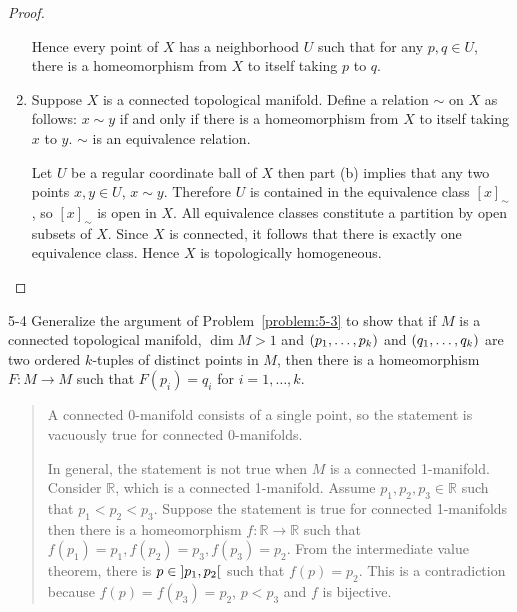 \begin{proof}
\begin{enumerate}[label={(\alph*)}]
		      Hence every point of \( X \) has a neighborhood \( U \) such that for any \( p, q \in U \), there is a homeomorphism from \( X \) to itself taking \( p \) to \( q \).
		\item Suppose \( X \) is a connected topological manifold. Define a relation \( \sim \) on \( X \) as follows: \( x \sim y \) if and only if there is a homeomorphism from \( X \) to itself taking \( x \) to \( y \). \( \sim \) is an equivalence relation.

		      Let \( U \) be a regular coordinate ball of \( X \) then part (b) implies that any two points \( x, y\in U \), \( x \sim y \). Therefore \( U \) is contained in the equivalence class \( {[x]}_{\sim} \), so \( {[x]}_{\sim} \) is open in \( X \). All equivalence classes constitute a partition by open subsets of \( X \). Since \( X \) is connected, it follows that there is exactly one equivalence class. Hence \( X \) is topologically homogeneous.
	\end{enumerate}
\end{proof}

\begin{problem}{5-4}\label{problem:5-4}
Generalize the argument of Problem~\ref{problem:5-3} to show that if \( M \) is a connected topological manifold, \( \dim M > 1 \) and \( \left({p_{1}, \ldots, p_{k}}\right) \) and \( \left({q_{1}, \ldots, q_{k}}\right) \) are two ordered \( k \)-tuples of distinct points in \( M \), then there is a homeomorphism \( F: M \to M \) such that \( F(p_{i}) = q_{i} \) for \( i = 1, \ldots, k \).
\end{problem}

\begin{quote}
	A connected 0-manifold consists of a single point, so the statement is vacuously true for connected 0-manifolds.

	In general, the statement is not true when \( M \) is a connected 1-manifold. Consider \( \mathbb{R} \), which is a connected 1-manifold. Assume \( p_{1}, p_{2}, p_{3}\in \mathbb{R} \) such that \( p_{1} < p_{2} < p_{3} \). Suppose the statement is true for connected 1-manifolds then there is a homeomorphism \( f: \mathbb{R} \to \mathbb{R} \) such that \( f(p_{1}) = p_{1}, f(p_{2}) = p_{3}, f(p_{3}) = p_{2} \). From the intermediate value theorem, there is \( p \in \left]{p_{1}, p_{2}}\right[ \) such that \( f(p) = p_{2} \). This is a contradiction because \( f(p) = f(p_{3}) = p_{2} \), \( p < p_{3} \) and \( f \) is bijective.
\end{quote}

